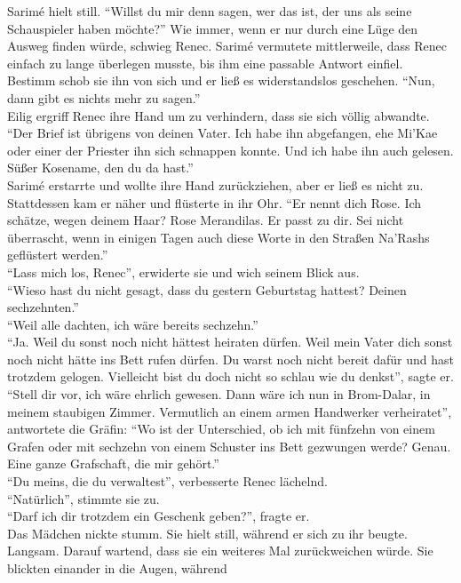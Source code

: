 Sarimé hielt still. ``Willst du mir denn sagen, wer das ist, der uns als seine Schauspieler haben 
möchte?''
Wie immer, wenn er nur durch eine Lüge den Ausweg finden würde, schwieg Renec. Sarimé vermutete 
mittlerweile, dass Renec einfach zu lange überlegen musste, bis ihm eine passable Antwort einfiel. 
Bestimm schob sie ihn von sich und er ließ es widerstandslos geschehen. ``Nun, dann gibt es nichts 
mehr zu sagen.''\\
Eilig ergriff Renec ihre Hand um zu verhindern, dass sie sich völlig abwandte. ``Der Brief ist 
übrigens von deinen Vater. Ich habe ihn abgefangen, ehe Mi'Kae oder einer der Priester ihn sich 
schnappen konnte. Und ich habe ihn auch gelesen. Süßer Kosename, den du da hast.''\\
Sarimé erstarrte und wollte ihre Hand zurückziehen, aber er ließ es nicht zu. Stattdessen kam er 
näher und flüsterte in ihr Ohr. ``Er nennt dich Rose. Ich schätze, wegen deinem Haar? Rose 
Merandilas. Er passt zu dir. Sei nicht überrascht, wenn in einigen Tagen auch diese Worte in den 
Straßen Na'Rashs geflüstert werden.''\\
``Lass mich los, Renec'', erwiderte sie und wich seinem Blick aus.\\
``Wieso hast du nicht gesagt, dass du gestern Geburtstag hattest? Deinen sechzehnten.''\\
``Weil alle dachten, ich wäre bereits sechzehn.''\\
``Ja. Weil du sonst noch nicht hättest heiraten dürfen. Weil mein Vater dich sonst noch nicht hätte 
ins Bett rufen dürfen. Du warst noch nicht bereit dafür und hast trotzdem gelogen. Vielleicht bist 
du doch nicht so schlau wie du denkst'', sagte er.\\
``Stell dir vor, ich wäre ehrlich gewesen. Dann wäre ich nun in Brom-Dalar, in meinem staubigen 
Zimmer. Vermutlich an einem armen Handwerker verheiratet'', antwortete die Gräfin: ``Wo ist der 
Unterschied, ob ich mit fünfzehn von einem Grafen oder mit sechzehn von einem Schuster ins Bett 
gezwungen werde? Genau. Eine ganze Grafschaft, die mir gehört.''\\
``Du meins, die du verwaltest'', verbesserte Renec lächelnd.\\
``Natürlich'', stimmte sie zu.\\
``Darf ich dir trotzdem ein Geschenk geben?'', fragte er.\\
Das Mädchen nickte stumm. Sie hielt still, während er sich zu ihr beugte. Langsam. Darauf 
wartend, dass sie ein weiteres Mal zurückweichen würde. Sie blickten einander in die Augen, während 
